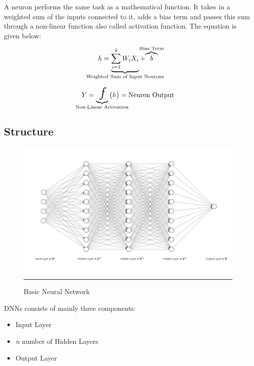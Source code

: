 A neuron performs the same task as a mathematical function. It takes in a weighted sum of the inputs connected to it, adds a bias term and passes this sum through a non-linear function also called activation function. The equation is given below:

\begin{equation}
h = \underbrace{\sum_{i=1}^{\textit{k}} {W_i}{X_i}}_{\mathclap{\text{Weighted Sum of Input Neurons}}} +\smash{\overbrace{b}^{\mathclap{\text{Bias Term}}}}
\end{equation}

\begin{equation}
Y = \underbrace{\huge{\textit{f}}}_{\mathclap{\text{Non-Linear Activation}}} \, \bigl( h \bigr)  = \text{Neuron Output}
\end{equation}




\subsection{Structure}


\begin{figure}[htbp]
  \centering
    \includegraphics[scale=0.7]{Figures/nn_basic_fig.JPG}
    \rule{35em}{0.5pt}
  \caption[Vanilla Neural Network]{Basic Neural Network}
  \label{fig:basic_nn}
\end{figure}



\Sourc
\clearpage

DNNs consists of mainly three components:
\begin{itemize}[noitemsep,topsep=0pt]
    \item Input Layer
    \item \textit{n} number of Hidden Layers
    \item Output Layer
\end{itemize}

